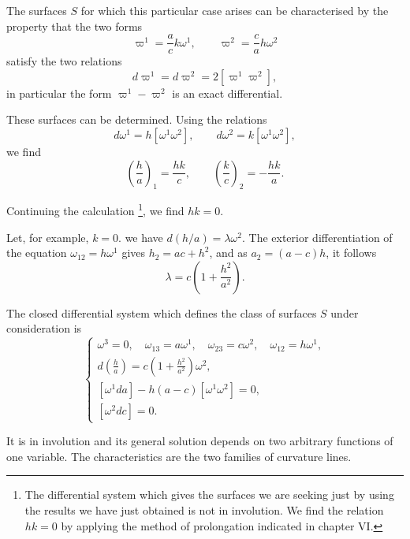 \documentclass[leqno,11pt]{book}
\numberwithin{equation}{chapter}
\theoremstyle{shape1}
\theoremstyle{shape0}
\theoremstyle{shape2}
\theoremstyle{definition}
\begin{document}
The surfaces $S$ for which this particular case arises can be characterised by the property that the two forms
\[
\varpi^{1}=\frac{a}{c}k\omega^{1},\qquad\varpi^{2}=\frac{c}{a}h\omega^{2}
\]
satisfy the two relations
\[
d\varpi^{1}=d\varpi^{2}=2[\varpi^{1}\varpi^{2}],
\]
in particular the form $\varpi^{1}-\varpi^{2}$ is an exact differential.

These surfaces can be determined. Using the relations
\[
d\omega^{1}=h[\omega^{1}\omega^{2}],\qquad d\omega^{2}=k[\omega^{1}\omega^{2}],
\]
we find
\[
\left(\frac{h}{a}\right)_{1}=\frac{hk}{c},\qquad
\left(\frac{k}{c}\right)_{2}=-\frac{hk}{a}.
\]

Continuing the calculation \footnote{The differential system which gives the surfaces we are seeking just by using the results we have just obtained is not in involution. We find the relation $hk=0$ by applying the method of prolongation indicated in chapter VI.}, we find $hk=0$.

Let, for example, $k=0$. we have $d(h/a)=\lambda\omega^{2}$. The exterior differentiation of the equation $\omega_{12}=h\omega^{1}$ gives $h_{2}=ac+h^{2}$, and as $a_{2}=(a-c)h$, it follows
\[
\lambda=c\left(1+\frac{h^{2}}{a^{2}}\right).
\]

The closed differential system which defines the class of surfaces  $S$ under consideration is
\begin{equation}
  \label{eq:7.VII.9}\tag{VII, 9}
  \left\{
    \begin{gathered}
      \omega^{3}=0,\quad\omega_{13}=a\omega^{1},\quad\omega_{23}=c\omega^{2},\quad\omega_{12}=h\omega^{1},\\
      d\left(\frac{h}{a}\right)=c\left(1+\frac{h^{2}}{a^{2}}\right)\omega^{2},\\
      [\omega^{1}da]-h(a-c)[\omega^{1}\omega^{2}]=0,\\
      [\omega^{2}dc]=0.
    \end{gathered}
  \right.
\end{equation}

It is in involution and its general solution depends on two arbitrary functions of one variable. The characteristics are the two families of curvature lines.
\end{document}
